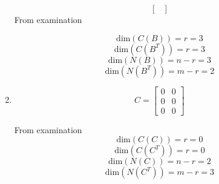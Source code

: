 \begin{enumerate}[label=(\alph*)]
\begin{equation}
\begin{bmatrix}
            \end{bmatrix}
        \end{equation}
            From examination
            \begin{mdframed}[style=MyFrame]
                \begin{equation}
                    \text{dim}(C(B)) = r = 3
                \end{equation}
                \begin{equation}
                    \text{dim}(C(B^{T})) = r = 3
                \end{equation}
                \begin{equation}
                    \text{dim}(N(B)) = n-r = 3 
                \end{equation}
                \begin{equation}
                    \text{dim}(N(B^{T})) = m-r = 2 
                \end{equation}
            \end{mdframed}
    \item 
        \begin{equation}
            C = 
            \begin{bmatrix}
                0   &   0   \\
                0   &   0   \\
                0   &   0
                
            \end{bmatrix}
        \end{equation}
        \begin{mdframed}[style=MyFrame]
            From examination
                \begin{equation}
                    \text{dim}(C(C)) = r = 0
                \end{equation}
                \begin{equation}
                    \text{dim}(C(C^{T})) = r = 0
                \end{equation}
                \begin{equation}
                    \text{dim}(N(C)) = n-r = 2 
                \end{equation}
                \begin{equation}
                    \text{dim}(N(C^{T})) = m-r = 3 
                \end{equation}
        \end{mdframed}
\end{enumerate}
